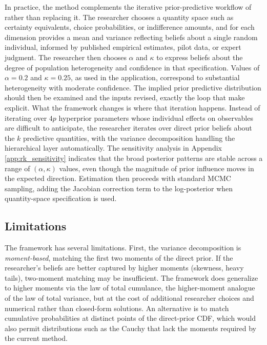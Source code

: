 \documentclass[12pt,a4paper]{article}
\theoremstyle{definition}
\theoremstyle{remark}
\begin{document}
In practice, the method complements the iterative prior-predictive workflow
of \textcite{Gabry2019} rather than replacing it. The researcher chooses a
quantity space such as certainty equivalents, choice probabilities, or
indifference amounts, and for each dimension provides a mean and variance
reflecting beliefs about a single random individual, informed by published
empirical estimates, pilot data, or expert judgment. The researcher then
chooses $\alpha$ and $\kappa$ to express beliefs about the degree of
population heterogeneity and confidence in that specification. Values of
$\alpha = 0.2$ and $\kappa = 0.25$, as used in the application, correspond to
substantial heterogeneity with moderate confidence. The implied prior
predictive distribution should then be examined and the inputs revised,
exactly the loop that \textcite{Gabry2019} make explicit. What the framework
changes is where that iteration happens. Instead of iterating over $4p$
hyperprior parameters whose individual effects on observables are difficult
to anticipate, the researcher iterates over direct prior beliefs about the
$k$ predictive quantities, with the variance decomposition handling the
hierarchical layer automatically. The sensitivity analysis in Appendix
\ref{app:rk_sensitivity} indicates that the broad posterior patterns are
stable across a range of $(\alpha, \kappa)$ values, even though the magnitude
of prior influence moves in the expected direction. Estimation then proceeds
with standard MCMC sampling, adding the Jacobian correction term to the
log-posterior when quantity-space specification is used.

\subsection{Limitations}

The framework has several limitations. First, the variance decomposition is
\textit{moment-based}, matching the first two moments of the direct prior. If
the researcher's beliefs are better captured by higher moments (skewness, heavy
tails), two-moment matching may be insufficient. The framework does generalize
to higher moments via the law of total cumulance, the higher-moment analogue
of the law of total variance, but at the cost of additional researcher
choices and numerical rather than closed-form solutions. An alternative is to
match cumulative probabilities at distinct points of the direct-prior CDF,
which would also permit distributions such as the Cauchy that lack the moments
required by the current method.
\end{document}
